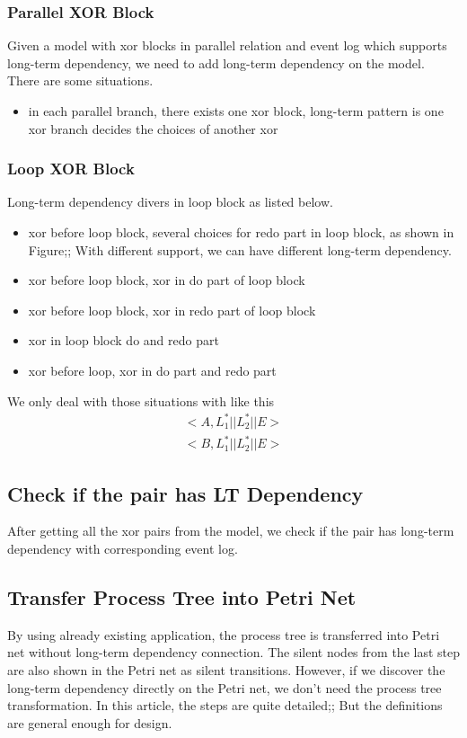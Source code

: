 \documentclass[]{article}
\begin{document}
\subsubsection{Parallel XOR Block}
Given a model with xor blocks in parallel relation and event log which supports long-term dependency, we need to add long-term dependency on the model. There are some situations.
\begin{itemize}
	\item in each parallel branch, there exists one xor block, long-term pattern is one xor branch decides the choices of another xor
\end{itemize}
\subsubsection{Loop XOR Block}
Long-term dependency divers in loop block as listed below. 
\begin{itemize}
	\item xor before loop block, several choices for redo part in loop block, as shown in Figure;; With different support, we can have different long-term dependency.
	\item xor before loop block, xor in do part of loop block
	\item xor before loop block, xor in redo part of loop block
	\item xor in loop block do and redo part
	\item xor before loop, xor in do part and redo part
\end{itemize}
We only deal with those situations with like this %
\begin{align}
<A, L_{1}^{*} || L_{2}^{*} || E> \\
<B, L_{1}^{*} || L_{2}^{*} || E>
\end{align}
\subsection{Check if the pair has LT Dependency}
After getting all the xor pairs from the model, we check if the pair has long-term dependency with corresponding event log.


\subsection{Transfer Process Tree into Petri Net}
By using already existing application, the process tree is transferred into Petri net without long-term dependency connection. The silent nodes from the last step are also shown in the Petri net as silent transitions.
However, if we discover the long-term dependency directly on the Petri net, we don't need the process tree transformation. In this article, the steps are quite detailed;; But the definitions are general enough for design. 
\end{document}
